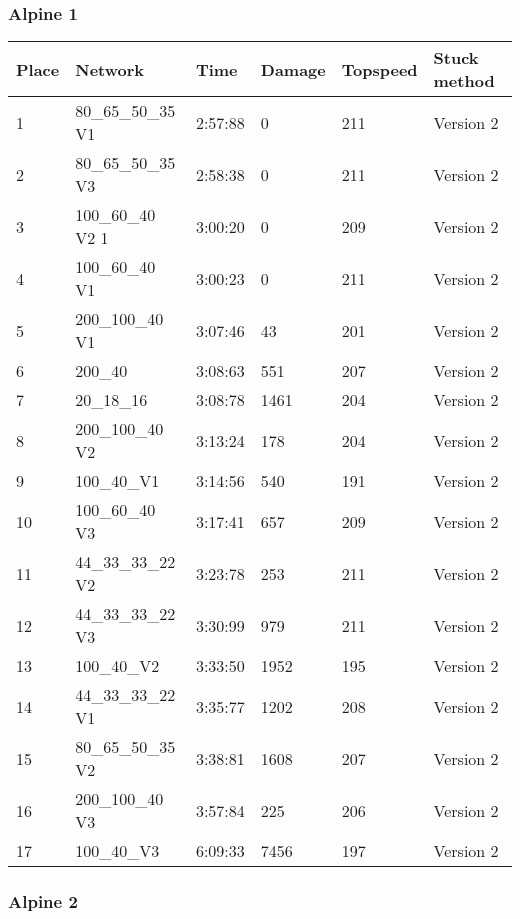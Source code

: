 \subsubsection*{Alpine 1}
\begin{table}[H]
\begin{tabular}{llllll}
 \textbf{Place} & \textbf{Network} & \textbf{Time} & \textbf{Damage} & \textbf{Topspeed}  & \textbf{Stuck method} \\ \hline
 1&  80\_65\_50\_35 V1  & 2:57:88 & 0 & 211 & Version 2 \\
 2&  80\_65\_50\_35 V3 & 2:58:38 & 0 & 211 & Version 2 \\
 3& 100\_60\_40 V2 1 & 3:00:20 & 0 & 209 & Version 2	\\
 4&  100\_60\_40 V1 & 3:00:23 & 0 & 211 & Version 2 \\  
 5 & 200\_100\_40 V1  & 3:07:46 & 43 & 201 & Version 2 \\
 6&  200\_40 & 3:08:63 & 551 & 207 & Version 2    \\
 7&  20\_18\_16  & 3:08:78  & 1461 & 204 & Version 2    \\
 8&  200\_100\_40 V2  & 3:13:24 & 178 & 204 & Version 2 \\
 9&   100\_40\_V1  & 3:14:56 & 540 & 191 & Version 2 \\
 10&  100\_60\_40 V3  & 3:17:41  & 657 & 209 & Version 2   \\ 
 11&  44\_33\_33\_22 V2  & 3:23:78 & 253 & 211 & Version 2 \\
 12&  44\_33\_33\_22 V3 & 3:30:99 & 979 & 211 & Version 2 \\
 13&   100\_40\_V2 & 3:33:50 & 1952 & 195 & Version 2 \\
 14&   44\_33\_33\_22 V1 & 3:35:77 & 1202 & 208 & Version 2 \\
 15&  80\_65\_50\_35 V2 & 3:38:81 & 1608 & 207 & Version 2 \\
 16&  200\_100\_40 V3  & 3:57:84 & 225 & 206 & Version 2 \\
 17&   100\_40\_V3  & 6:09:33 & 7456 & 197 & Version 2 \\
\end{tabular}
\end{table}

\subsubsection*{Alpine 2}

